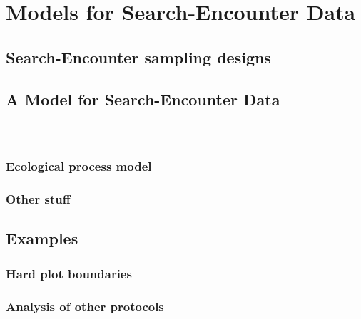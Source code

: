 \chapter{Models for  Search-Encounter Data}
\label{chapt.search-encounter}



\section{Search-Encounter sampling designs}


\begin{figure}
\centering
\label{searchencounter.fig.snakeline}
\end{figure}



\section{A Model for Search-Encounter Data}

\begin{equation}
\label{eq.hazard}
\end{equation}

\begin{equation}
\label{eq.totalhazard}
\end{equation}


\begin{equation}
\label{eq.encounterprob}
\end{equation}


\subsection{Ecological process model } 




\subsection{Other stuff}


\section{Examples}


\subsection{Hard plot boundaries}


\subsection{Analysis of other protocols}




